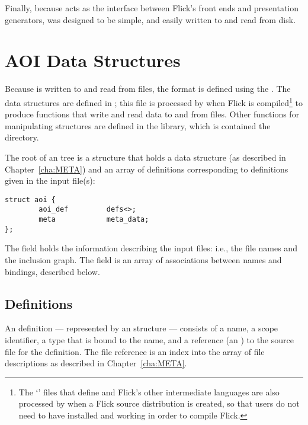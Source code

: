 Finally, because \AOI{} acts as the interface between Flick's front ends and
presentation generators, \AOI{} was designed to be simple, and easily written
to and read from disk.



\section{AOI Data Structures}
\label{sec:AOI:AOI Data Structures}

Because \AOI{} is written to and read from files, the \AOI{} format is defined
using the \ONCRPC{} \IDL{}\@.  The data structures are defined in
; this file is processed by \rpcgen{} when Flick is
compiled\footnote{The `' files that define \AOI{} and Flick's
other intermediate languages are also processed by \rpcgen{} when a Flick
source distribution is created, so that users do not need to have \rpcgen{}
installed and working in order to compile Flick.} to produce functions that
write and read \AOI{} data to and from files.  Other functions for manipulating
\AOI{} structures are defined in the \AOI{} library, which is contained the
 directory.

The root of an \AOI{} tree is a structure that holds a \META{} data structure
(as described in Chapter~\ref{cha:META}) and an array of \AOI{} definitions
corresponding to definitions given in the input \IDL{} file(s):

\begin{verbatim}
struct aoi {
        aoi_def         defs<>;
        meta            meta_data;
};
\end{verbatim}

The  field holds the \META{} information describing the input
\IDL{} files: i.e., the file names and the inclusion graph.  The 
field is an array of associations between names and bindings, described below.



\subsection{Definitions}
\label{subsec:AOI:Definitions}

An \AOI{} definition --- represented by an  structure --- consists
of a name, a scope identifier, a type that is bound to the name, and a
reference (an ) to the source file for the definition.  The
file reference is an index into the \META{} array of file descriptions as
described in Chapter~\ref{cha:META}.

